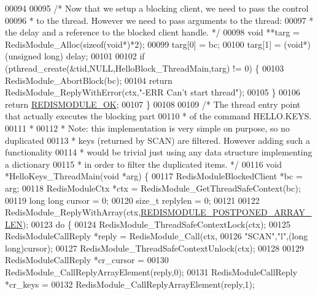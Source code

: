 \begin{DoxyCode}
00094 
00095     \textcolor{comment}{/* Now that we setup a blocking client, we need to pass the control}
00096 \textcolor{comment}{     * to the thread. However we need to pass arguments to the thread:}
00097 \textcolor{comment}{     * the delay and a reference to the blocked client handle. */}
00098     \textcolor{keywordtype}{void} **targ = RedisModule\_Alloc(\textcolor{keyword}{sizeof}(\textcolor{keywordtype}{void}*)*2);
00099     targ[0] = bc;
00100     targ[1] = (\textcolor{keywordtype}{void}*)(\textcolor{keywordtype}{unsigned} \textcolor{keywordtype}{long}) delay;
00101 
00102     \textcolor{keywordflow}{if} (pthread\_create(&tid,NULL,HelloBlock\_ThreadMain,targ) != 0) \{
00103         RedisModule\_AbortBlock(bc);
00104         \textcolor{keywordflow}{return} RedisModule\_ReplyWithError(ctx,\textcolor{stringliteral}{"-ERR Can't start thread"});
00105     \}
00106     \textcolor{keywordflow}{return} \hyperlink{redismodule_8h_a1bc5bfd69abcd378ff52c640adc5418d}{REDISMODULE\_OK};
00107 \}
00108 
00109 \textcolor{comment}{/* The thread entry point that actually executes the blocking part}
00110 \textcolor{comment}{ * of the command HELLO.KEYS.}
00111 \textcolor{comment}{ *}
00112 \textcolor{comment}{ * Note: this implementation is very simple on purpose, so no duplicated}
00113 \textcolor{comment}{ * keys (returned by SCAN) are filtered. However adding such a functionality}
00114 \textcolor{comment}{ * would be trivial just using any data structure implementing a dictionary}
00115 \textcolor{comment}{ * in order to filter the duplicated items. */}
00116 \textcolor{keywordtype}{void} *HelloKeys\_ThreadMain(\textcolor{keywordtype}{void} *arg) \{
00117     RedisModuleBlockedClient *bc = arg;
00118     RedisModuleCtx *ctx = RedisModule\_GetThreadSafeContext(bc);
00119     \textcolor{keywordtype}{long} \textcolor{keywordtype}{long} cursor = 0;
00120     size\_t replylen = 0;
00121 
00122     RedisModule\_ReplyWithArray(ctx,\hyperlink{redismodule_8h_af07005134cbf107aad1c8e0ded8fcf2b}{REDISMODULE\_POSTPONED\_ARRAY\_LEN});
00123     \textcolor{keywordflow}{do} \{
00124         RedisModule\_ThreadSafeContextLock(ctx);
00125         RedisModuleCallReply *reply = RedisModule\_Call(ctx,
00126             \textcolor{stringliteral}{"SCAN"},\textcolor{stringliteral}{"l"},(\textcolor{keywordtype}{long} \textcolor{keywordtype}{long})cursor);
00127         RedisModule\_ThreadSafeContextUnlock(ctx);
00128 
00129         RedisModuleCallReply *cr\_cursor =
00130             RedisModule\_CallReplyArrayElement(reply,0);
00131         RedisModuleCallReply *cr\_keys =
00132             RedisModule\_CallReplyArrayElement(reply,1);

\end{DoxyCode}
